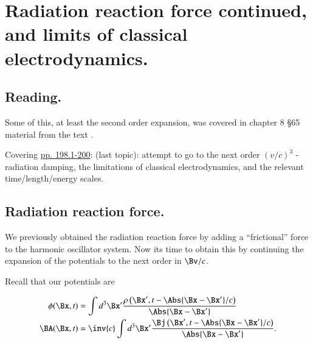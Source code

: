 %
%

\chapter{Radiation reaction force continued, and limits of classical electrodynamics.}
\label{chap:relativisticElectrodynamicsL27}
{}
\date{April 6, 2011}

\beginArtNoToc

\section{Reading.}

Some of this, at least the second order expansion, was covered in chapter 8 \S 65 material from the text \cite{landau1980classical}. 

Covering \href{http://www.physics.utoronto.ca/~poppitz/epoppitz/PHY450_files/RelEMpp181-195.pdf}{pp. 198.1-200}: (last topic): attempt to go to the next order $(v/c)^3$ - radiation damping, the limitations of classical electrodynamics, and the relevant time/length/energy scales.

\section{Radiation reaction force.}

We previously obtained the radiation reaction force by adding a ``frictional'' force to the harmonic oscillator system.  Now its time to obtain this by continuing the expansion of the potentials to the next order in $\Bv/c$.

Recall that our potentials are

\begin{align}\label{eqn:relativisticElectrodynamicsL27:10}
\phi(\Bx, t) &= \int d^3 \Bx' \frac{\rho\left(\Bx', t - \Abs{\Bx - \Bx'}/c\right)}{\Abs{\Bx - \Bx'}} \\
\BA(\Bx, t) &= \inv{c}\int d^3 \Bx' \frac{\Bj\left(\Bx', t - \Abs{\Bx - \Bx'}/c\right)}{\Abs{\Bx - \Bx'}}.
\end{align}


